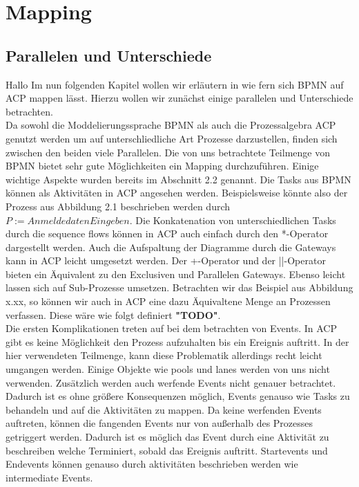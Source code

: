 
\chapter{Mapping} %

\label{Chapter3} %


\section{Parallelen und Unterschiede}
Hallo
Im nun folgenden Kapitel wollen wir erläutern in wie fern sich BPMN auf ACP mappen lässt. Hierzu wollen wir zunächst einige parallelen und Unterschiede betrachten. \\
Da sowohl die Moddelierungssprache BPMN als auch die Prozessalgebra ACP genutzt werden um auf unterschliedliche Art Prozesse darzustellen, finden sich zwischen den beiden viele Parallelen. Die von uns betrachtete Teilmenge von BPMN bietet sehr gute Möglichkeiten ein Mapping durchzuführen. Einige wichtige Aspekte wurden bereits im Abschnitt 2.2 genannt. Die Tasks aus BPMN können als Aktivitäten in ACP angesehen werden. Beispielsweise könnte also der Prozess aus Abbildung 2.1 beschrieben werden durch $P:=AnmeldedatenEingeben.$ Die Konkatenation von unterschiedlichen Tasks durch die sequence flows können in ACP auch einfach durch den *-Operator dargestellt werden. Auch die Aufspaltung der Diagramme durch die Gateways kann in ACP leicht umgesetzt werden. Der +-Operator und der ||-Operator bieten ein Äquivalent zu den Exclusiven und Parallelen Gateways. Ebenso leicht lassen sich auf Sub-Prozesse umsetzen. Betrachten wir das Beispiel aus Abbildung x.xx, so können wir auch in ACP eine dazu Äquivaltene Menge an Prozessen verfassen. Diese wäre wie folgt definiert \textbf{"TODO"}.\\
Die ersten Komplikationen treten auf bei dem betrachten von Events. In ACP gibt es keine Möglichkeit den Prozess aufzuhalten bis ein Ereignis auftritt. In der hier verwendeten Teilmenge, kann diese Problematik allerdings recht leicht umgangen werden. Einige Objekte wie pools und lanes werden von uns nicht verwenden. Zusätzlich werden auch werfende Events nicht genauer betrachtet. Dadurch ist es ohne größere Konsequenzen möglich, Events genauso wie Tasks zu behandeln und auf die Aktivitäten zu mappen. Da keine werfenden Events auftreten, können die fangenden Events nur von außerhalb des Prozesses getriggert werden. Dadurch ist es möglich das Event durch eine Aktivität zu beschreiben welche Terminiert, sobald das Ereignis auftritt. Startevents und Endevents können genauso durch aktivitäten beschrieben werden wie intermediate Events. \\
